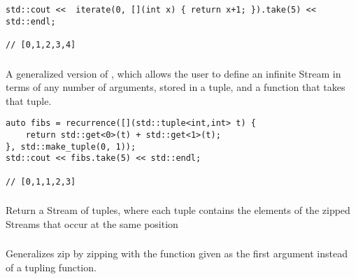 \begin{lstlisting}[title=example]
std::cout <<  iterate(0, [](int x) { return x+1; }).take(5) << std::endl;

// [0,1,2,3,4]
\end{lstlisting}

\subsubsection{}

A generalized version of , which allows the user to define an infinite Stream in terms of any number of arguments, stored in a tuple, and a function that takes that tuple.

\begin{lstlisting}[title=example]
auto fibs = recurrence([](std::tuple<int,int> t) {
    return std::get<0>(t) + std::get<1>(t);
}, std::make_tuple(0, 1));
std::cout << fibs.take(5) << std::endl;

// [0,1,1,2,3]
\end{lstlisting}



\subsubsection{}

Return a Stream of tuples, where each tuple contains the elements of the zipped Streams that occur at the same position

\subsubsection{}

Generalizes zip by zipping with the function given as the first argument instead of a tupling function.



